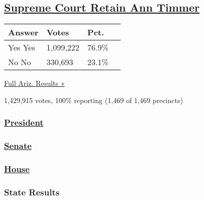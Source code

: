 \hypertarget{supreme-court-retain-ann-timmer}{%
\subsection{\texorpdfstring{\href{https://www.nytimes3xbfgragh.onion/elections/2016/results/arizona-supreme-court-retain-ann-timmer}{Supreme
Court Retain Ann
Timmer}}{Supreme Court Retain Ann Timmer}}\label{supreme-court-retain-ann-timmer}}

\begin{longtable}[]{@{}llll@{}}
\toprule
Answer & Votes & Pct. &\tabularnewline
\midrule
\endhead
 Yes Yes & 1,099,222 & 76.9\% &\tabularnewline
 No No & 330,693 & 23.1\% &\tabularnewline
\bottomrule
\end{longtable}

\href{https://www.nytimes3xbfgragh.onion/elections/2016/results/arizona}{Full
Ariz. Results »}

1,429,915 votes, 100\% reporting (1,469 of 1,469 precincts)

\hypertarget{president-1}{%
\subsubsection{\texorpdfstring{\href{//www.nytimes3xbfgragh.onion/elections/2016/results/president}{President}}{President}}\label{president-1}}

\hypertarget{senate}{%
\subsubsection{\texorpdfstring{\href{//www.nytimes3xbfgragh.onion/elections/2016/results/senate}{Senate}}{Senate}}\label{senate}}

\hypertarget{house}{%
\subsubsection{\texorpdfstring{\href{//www.nytimes3xbfgragh.onion/elections/2016/results/house}{House}}{House}}\label{house}}

\hypertarget{state-results}{%
\subsubsection{State Results}\label{state-results}}


